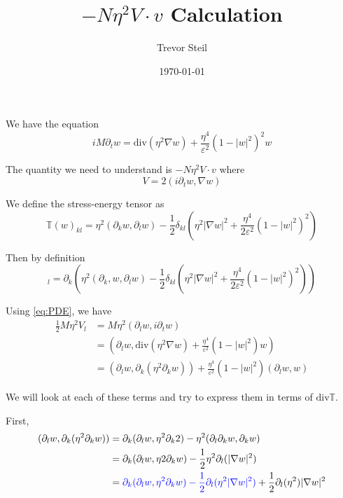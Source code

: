 \documentclass[a4paper]{article}
\title{$-N \eta^2 V \cdot v$ Calculation}
\date{\today}
\author{Trevor Steil}
\renewcommand{\div}{\mathrm{div}}
\newlength{\horizspace}
\newlength{\smallspace}
\begin{document}
\setlength{\horizspace}{1.5cm}
\setlength{\smallspace}{.7cm}
\maketitle


We have the equation
\begin{equation}
  i M \partial_t w = \div (\eta^2 \nabla w) + \frac{\eta^4}{\varepsilon^2} (1-|w|^2)^2 w
  \label{eq:PDE}
\end{equation}

The quantity we need to understand is $-N \eta^2 V \cdot v$ where
\begin{equation}
  V = 2 ( i \partial_t w, \nabla w )
  \label{def:V}
\end{equation}

We define the stress-energy tensor as
\begin{equation}
  \mathbb{T}(w)_{kl} = \eta^2 (\partial_k w, \partial_l w) - \frac{1}{2} \delta_{kl} \left( \eta^2 | \nabla w |^2 + \frac{\eta^4}{2 \varepsilon^2}
  (1-|w|^2)^2 \right)
  \label{def:T}
\end{equation}

Then by definition
\begin{equation}
  [ \div \mathbb{T}(w) ]_l = \partial_k \left( \eta^2 (\partial_k, w, \partial_l w) - \frac{1}{2} \delta_{kl} \left( \eta^2 |\nabla w|^2 +
  \frac{\eta^4}{2 \varepsilon^2} ( 1- |w|^2 )^2 \right) \right)
  \label{eq:div_T}
\end{equation}

Using \eqref{eq:PDE}, we have
\begin{align}
  \frac{1}{2} M \eta^2 V_l &= M \eta^2 ( \partial_l w, i \partial_t w ) \nonumber \\
  &= \left( \partial_l w, \div ( \eta^2 \nabla w ) + \frac{\eta^4}{\varepsilon^2}( 1 - |w|^2 )w \right) \nonumber \\
  &= ( \partial_l w, \partial_k ( \eta^2 \partial_k w ) ) + \frac{\eta^4}{\varepsilon^2} ( 1 - |w|^2 ) ( \partial_l w, w )
  \label{eq:V_l}
\end{align}

We will look at each of these terms and try to express them in terms of $\div \mathbb{T}$.

First,
\begin{align}
  ( \partial_l w, \partial_k ( \eta^2 \partial_k w ) ) &= \partial_k ( \partial_l w, \eta^2 \partial_k 2) - \eta^2 ( \partial_l \partial_k w,
  \partial_k w ) \nonumber \\
  &= \partial_k ( \partial_l w, \eta2 \partial_k w) - \frac{1}{2} \eta^2 \partial_l ( | \nabla w |^2 ) \nonumber \\
  &= { \color{blue} \partial_k ( \partial_l w, \eta^2 \partial_k w) - \frac{1}{2} \partial_l ( \eta^2 |\nabla w|^2 ) } + \frac{1}{2} \partial_l
  (\eta^2) | \nabla w |^2
  \label{eq:V_l_term1}
\end{align}
\end{document}
